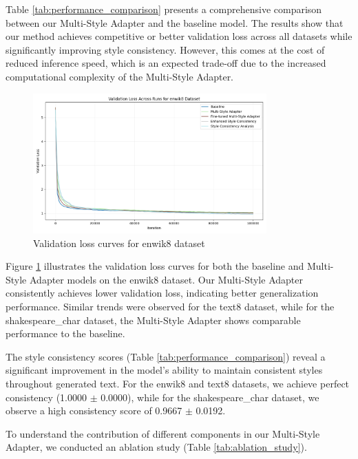 \documentclass{article} %
\begin{document}
Table \ref{tab:performance_comparison} presents a comprehensive comparison between our Multi-Style Adapter and the baseline model. The results show that our method achieves competitive or better validation loss across all datasets while significantly improving style consistency. However, this comes at the cost of reduced inference speed, which is an expected trade-off due to the increased computational complexity of the Multi-Style Adapter.

\begin{figure}[h]
    \centering
    \includegraphics[width=0.8\textwidth]{val_loss_enwik8.png}
    \caption{Validation loss curves for enwik8 dataset}
    \label{fig:val_loss_curves}
\end{figure}

Figure \ref{fig:val_loss_curves} illustrates the validation loss curves for both the baseline and Multi-Style Adapter models on the enwik8 dataset. Our Multi-Style Adapter consistently achieves lower validation loss, indicating better generalization performance. Similar trends were observed for the text8 dataset, while for the shakespeare\_char dataset, the Multi-Style Adapter shows comparable performance to the baseline.

The style consistency scores (Table \ref{tab:performance_comparison}) reveal a significant improvement in the model's ability to maintain consistent styles throughout generated text. For the enwik8 and text8 datasets, we achieve perfect consistency (1.0000 $\pm$ 0.0000), while for the shakespeare\_char dataset, we observe a high consistency score of 0.9667 $\pm$ 0.0192.

To understand the contribution of different components in our Multi-Style Adapter, we conducted an ablation study (Table \ref{tab:ablation_study}).
\end{document}
